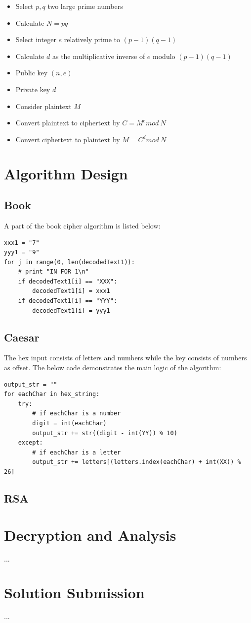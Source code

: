 \documentclass[12pt]{article}
\begin{document}
\begin{itemize}
\item Select $p, q$ two large prime numbers
\item Calculate $N = pq$
\item Select integer $e$ relatively prime to $(p-1)(q-1)$
\item Calculate $d$ as the multiplicative inverse of $e$ modulo $(p-1)(q-1)$
\item Public key $(n, e)$
\item Private key $d$
\item Consider plaintext $M$
\item Convert plaintext to ciphertext by $C=M^{e}mod\ N$
\item Convert ciphertext to plaintext by $M=C^{d}mod\ N$
\end{itemize}

\section{Algorithm Design}
\subsection{Book}
A part of the book cipher algorithm is listed below:
\begin{lstlisting}
xxx1 = "7"
yyy1 = "9"
for j in range(0, len(decodedText1)):
    # print "IN FOR 1\n"
    if decodedText1[i] == "XXX":
        decodedText1[i] = xxx1
    if decodedText1[i] == "YYY":
        decodedText1[i] = yyy1
\end{lstlisting}
\subsection{Caesar}
The hex input consists of letters and numbers while the key consists of numbers as offset. The below code demonstrates the main logic of the algorithm:
\begin{lstlisting}
output_str = ""
for eachChar in hex_string:
    try:
    	# if eachChar is a number
        digit = int(eachChar)
        output_str += str((digit - int(YY)) % 10)
    except:
    	# if eachChar is a letter
        output_str += letters[(letters.index(eachChar) + int(XX)) % 26]
\end{lstlisting}
\subsection{RSA}

\section{Decryption and Analysis}
...

\section{Solution Submission}
...



\end{document}
